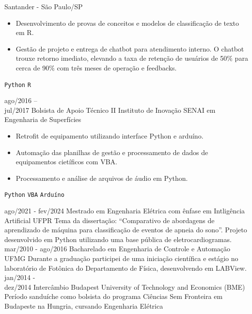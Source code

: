 \documentclass[9pt]{developercv} %
\begin{document}
\begin{entrylist}
		{Santander - São Paulo/SP}
		{\vspace{-10pt}
			\begin{itemize}[noitemsep,topsep=0pt,parsep=0pt,partopsep=0pt, leftmargin=-1pt]
				\item Desenvolvimento de provas de conceitos e modelos de classificação de texto em R.
				\item Gestão de projeto e entrega de chatbot para atendimento interno. O chatbot trouxe retorno imediato, elevando a taxa de retenção de usuários de 50\% para cerca de 90\% com três meses de operação e feedbacks.
			\end{itemize} 
			\texttt{Python} \slashsep \texttt{R}}
		\entry
		{ago/2016 -- \\jul/2017}
		{Bolsista de Apoio Técnico II}
		{Instituto de Inovação SENAI em Engenharia de Superfícies}
		{\vspace{-10pt}
			\begin{itemize}[noitemsep,topsep=0pt,parsep=0pt,partopsep=0pt, leftmargin=-1pt]
				\item Retrofit de equipamento utilizando interface Python e arduíno.
				\item Automação das planilhas de gestão e processamento de dados de equipamentos cietíficos com VBA.
				\item Processamento e análise de arquivos de áudio em Python.
			\end{itemize} 
			\texttt{Python} \slashsep \texttt{VBA} \slashsep \texttt{Arduíno}}
	\end{entrylist}
	
	\vspace{-10 pt}
	\begin{entrylist}
		\entry
		{ago/2021 - fev/2024}
		{Mestrado em Engenharia Elétrica com ênfase em Intligência Artificial}
		{UFPR}
		{Tema da dissertação: “Comparativo de abordagens de aprendizado de máquina para classificação de eventos de apneia do sono”. Projeto desenvolvido em Python utilizando uma base pública de eletrocardiogramas.}
		\entry
		{mar/2010 - ago/2016}
		{Bacharelado em Engenharia de Controle e Automação}
		{UFMG}
		{Durante a graduação participei de uma iniciação científica e estágio no laboratório de Fotônica do Departamento de Física, desenvolvendo em LABView.}
		\entry
		{jan/2014 - \\dez/2014}
		{Intercâmbio}
		{Budapest University of Technology and Economics (BME)}
		{Período sanduíche como bolsista do programa Ciências Sem Fronteira em Budapeste na Hungria, cursando Engenharia Elétrica}
	\end{entrylist}
	
\end{document}
